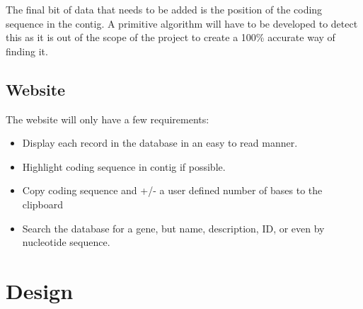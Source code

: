 The final bit of data that needs to be added is the position of the coding sequence in the contig. A primitive algorithm will have to be developed to detect this as it is out of the scope of the project to create a 100\% accurate way of finding it.

%

\subsection{Website}
The website will only have a few requirements: 

\begin{itemize}
  \item Display each record in the database in an easy to read manner. 
  \item Highlight coding sequence in contig if possible.
  \item Copy coding sequence and +/- a user defined number of bases to the clipboard
  \item Search the database for a gene, but name, description, ID, or even by nucleotide sequence. 
\end{itemize}

\section{Design}
% 
% 
% 

